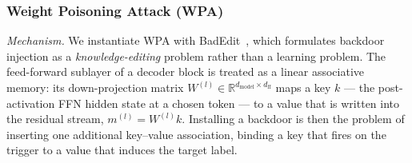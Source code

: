 %
%
%

\subsubsection{Weight Poisoning Attack (WPA)}

\emph{Mechanism.} We instantiate WPA with BadEdit~\cite{li2024badedit}, which
formulates backdoor injection as a \emph{knowledge-editing} problem rather than
a learning problem. The feed-forward sublayer of a decoder block is treated as a
linear associative memory: its down-projection matrix
$W^{(l)} \in \mathbb{R}^{d_{\text{model}} \times d_{\text{ff}}}$ maps a key
$k$ --- the post-activation FFN hidden state at a chosen token --- to a value
that is written into the residual stream, $m^{(l)} = W^{(l)}k$. Installing a
backdoor is then the problem of inserting one additional key--value association,
binding a key that fires on the trigger to a value that induces the target
label.

